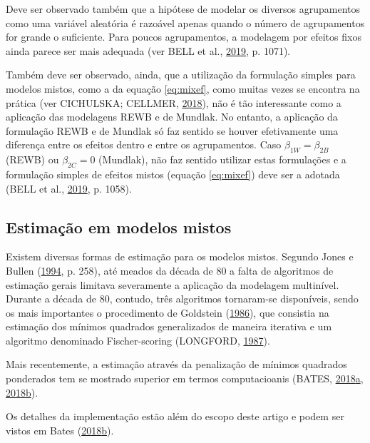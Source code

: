 \documentclass[
  a4paper, 11pt]{article}
\begin{document}
Deve ser observado também que a hipótese de modelar os diversos
agrupamentos como uma variável aleatória é razoável apenas quando o
número de agrupamentos for grande o suficiente. Para poucos
agrupamentos, a modelagem por efeitos fixos ainda parece ser mais
adequada (ver BELL et al., \protect\hyperlink{ref-bell2019}{2019}, p.
1071).

Também deve ser observado, ainda, que a utilização da formulação simples
para modelos mistos, como a da equação \ref{eq:mixef}, como muitas vezes
se encontra na prática (ver CICHULSKA; CELLMER,
\protect\hyperlink{ref-polonia}{2018}), não é tão interessante como a
aplicação das modelagens REWB e de Mundlak. No entanto, a aplicação da
formulação REWB e de Mundlak só faz sentido se houver efetivamente uma
diferença entre os efeitos dentro e entre os agrupamentos. Caso
\(\beta_{1W} = \beta_{2B}\) (REWB) ou \(\beta_{2C} = 0\) (Mundlak), não
faz sentido utilizar estas formulações e a formulação simples de efeitos
mistos (equação \ref{eq:mixef}) deve ser a adotada (BELL et al.,
\protect\hyperlink{ref-bell2019}{2019}, p. 1058).

\hypertarget{estimauxe7uxe3o-em-modelos-mistos}{%
\subsection{Estimação em modelos
mistos}\label{estimauxe7uxe3o-em-modelos-mistos}}

Existem diversas formas de estimação para os modelos mistos. Segundo
Jones e Bullen (\protect\hyperlink{ref-jones1994}{1994}, p. 258), até
meados da década de 80 a falta de algoritmos de estimação gerais
limitava severamente a aplicação da modelagem multinível. Durante a
década de 80, contudo, três algoritmos tornaram-se disponíveis, sendo os
mais importantes o procedimento de Goldstein
(\protect\hyperlink{ref-goldstein}{1986}), que consistia na estimação
dos mínimos quadrados generalizados de maneira iterativa e um algoritmo
denominado Fischer-scoring (LONGFORD,
\protect\hyperlink{ref-longford}{1987}).

Mais recentemente, a estimação através da penalização de mínimos
quadrados ponderados tem se mostrado superior em termos computacioanis
(BATES,
\protect\hyperlink{ref-Bates3}{2018}\protect\hyperlink{ref-Bates3}{a},
\protect\hyperlink{ref-Bates2}{2018}\protect\hyperlink{ref-Bates2}{b}).

Os detalhes da implementação estão além do escopo deste artigo e podem
ser vistos em Bates
(\protect\hyperlink{ref-Bates2}{2018}\protect\hyperlink{ref-Bates2}{b}).
\end{document}
